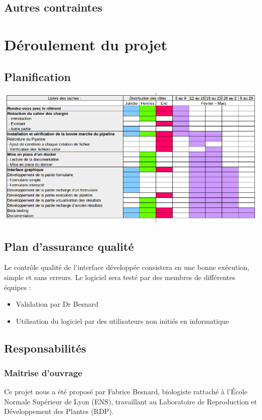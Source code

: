 \documentclass[12pt]{article}
\begin{document}
\subsection{Autres contraintes}
\section{Déroulement du projet}
\subsection{Planification}

\includegraphics[scale=0.6]{gantt.png}

\subsection{Plan d'assurance qualité}

Le contrôle qualité de l'interface développée consistera en une bonne exécution, simple et sans erreurs. Le logiciel sera testé par des membres de différentes équipes :

\begin{itemize}
\item Validation par Dr Besnard
\item Utilisation du logiciel par des utilisateurs non initiés en informatique
\end{itemize}

\subsection{Responsabilités}
\subsubsection{Maîtrise d'ouvrage}

Ce projet nous a été proposé par Fabrice Besnard, biologiste rattaché à l’École Normale Supérieur de Lyon (ENS), travaillant au Laboratoire de Reproduction et Développement des Plantes (RDP).
\end{document}
